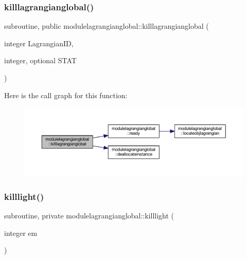 \mbox{\label{namespacemodulelagrangianglobal_a0c95242d79d3bded29c18e1055a5a11d}} 
\subsubsection{\texorpdfstring{killlagrangianglobal()}{killlagrangianglobal()}}
{\footnotesize\ttfamily subroutine, public modulelagrangianglobal\+::killlagrangianglobal (\begin{DoxyParamCaption}\item[{integer}]{Lagrangian\+ID,  }\item[{integer, optional}]{S\+T\+AT }\end{DoxyParamCaption})}

Here is the call graph for this function\+:\nopagebreak
\begin{figure}[H]
\begin{center}
\leavevmode
\includegraphics[width=350pt]{namespacemodulelagrangianglobal_a0c95242d79d3bded29c18e1055a5a11d_cgraph}
\end{center}
\end{figure}
\mbox{\label{namespacemodulelagrangianglobal_ae738cd408e31ba7ac9158f7d3e11b53a}} 
\subsubsection{\texorpdfstring{killlight()}{killlight()}}
{\footnotesize\ttfamily subroutine, private modulelagrangianglobal\+::killlight (\begin{DoxyParamCaption}\item[{integer}]{em }\end{DoxyParamCaption})\hspace{0.3cm}{\ttfamily [private]}}

